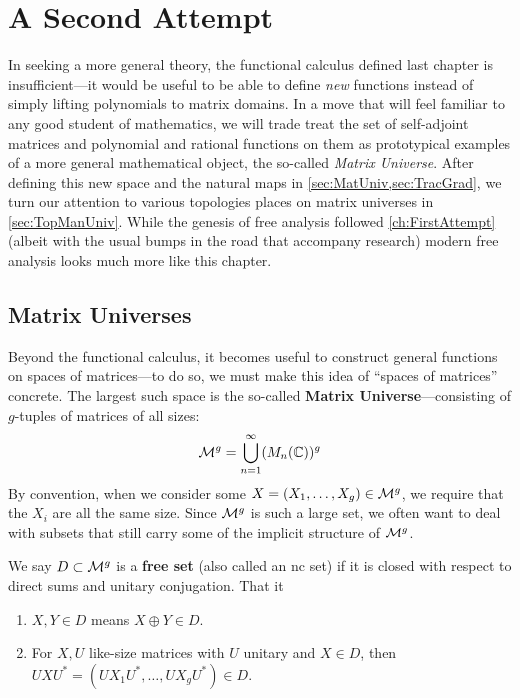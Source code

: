\chapter{A Second Attempt}\label{ch:SecondAttempt}

In seeking a more general theory, the functional calculus defined last chapter
is insufficient---it would be useful to be able to define \emph{new} functions
instead of simply lifting polynomials to matrix domains. In a move that will
feel familiar to any good student of mathematics, we will trade treat the
set of self-adjoint matrices and polynomial and rational functions on them
as prototypical examples of a more general mathematical
object, the so-called \emph{Matrix Universe}.
After defining this new space and the natural maps in
\cref{sec:MatUniv,sec:TracGrad}, we turn our attention to various topologies
places on matrix universes in \cref{sec:TopManUniv}. While the genesis of free
analysis followed \cref{ch:FirstAttempt} (albeit with the usual bumps in the
road that accompany research) modern free analysis looks much more like this
chapter.

\section{Matrix Universes}%
\label{sec:MatUniv}

Beyond the functional calculus, it becomes useful to construct general functions
on spaces of matrices---to do so, we must make this idea of ``spaces of
matrices'' concrete. The largest such space is the so-called \textbf{Matrix
  Universe}---consisting of \(g\)-tuples of matrices of all sizes:
\[
  \mathcal{M}^g = \bigcup_{n=1}^\infty (M_n(\mathbb{C}))^g
\]
By convention, when we consider some
\(X = \left( X_1, \dots , X_g \right) \in \mathcal{M}^g\), we require that the \(X_i\)
are all the same size. Since \(\mathcal{M}^g\) is such a large set, we often want to
deal with subsets that still carry some of the implicit structure of \(\mathcal{M}^g\).
\begin{definition}
  \label{def:FreeSet}
  We say \(D \subset \mathcal{M}^g\) is a \textbf{free set} (also called an nc set) if it is closed with respect
  to direct sums and unitary conjugation. That it
  \begin{enumerate}
    \item \(X,Y \in D \) means \(X\oplus Y \in D\).
    \item For \(X,U\) like-size matrices with \(U\) unitary and \(X \in D\),
          then \(U X U^* = \left( UX_1U^*, \dots , UX_g U^*  \right) \in D \).
  \end{enumerate}
\end{definition}


